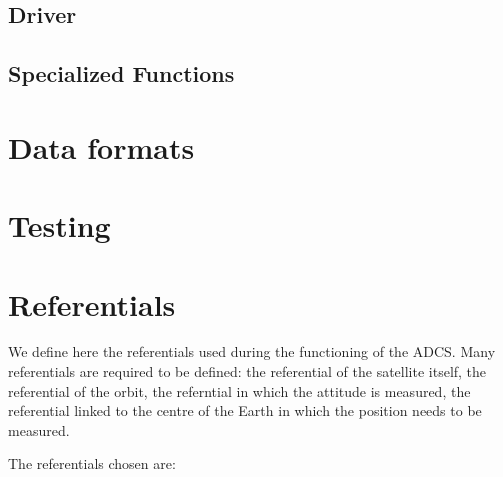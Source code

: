 \documentclass[11pt,a4paper]{report}
\begin{document}
\section{Driver} 

\section{Specialized Functions} 

\chapter{Data formats}\thispagestyle{fancy}

\chapter{Testing}\thispagestyle{fancy} 

\chapter{Referentials}\thispagestyle{fancy} 

We define here the referentials used during the functioning of the ADCS. Many referentials are required to be defined: the referential of the satellite itself, the referential of the orbit, the referntial in which the attitude is measured, the referential linked to the centre of the Earth in which the position needs to be measured. 

The referentials chosen are: 
\end{document}
